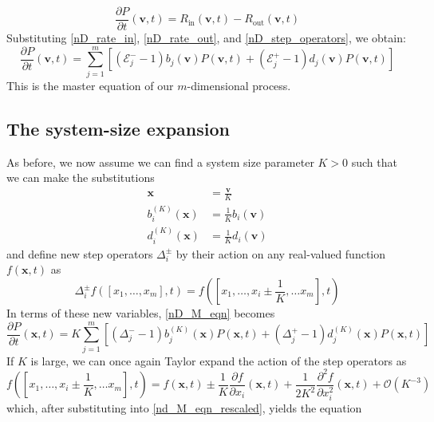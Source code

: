 \begin{equation}
\frac{\partial P}{\partial t}(\mathbf{v},t) = R_{\textrm{in}}(\mathbf{v},t) - R_{\textrm{out}}(\mathbf{v},t)
\end{equation}
Substituting \eqref{nD_rate_in}, \eqref{nD_rate_out}, and \eqref{nD_step_operators}, we obtain:
\begin{equation}
\label{nD_M_eqn}
\frac{\partial P}{\partial t}(\mathbf{v},t) = \sum\limits_{j=1}^{m}\left[(\mathcal{E}_j^{-}-1)b_j(\mathbf{v})P(\mathbf{v},t) + (\mathcal{E}_j^{+}-1)d_j(\mathbf{v})P(\mathbf{v},t)\right]
\end{equation}
This is the master equation of our $m$-dimensional process.

\subsection{The system-size expansion}
As before, we now assume we can find a system size parameter $K > 0$ such that we can make the substitutions
\begin{align*}
\mathbf{x} &= \frac{\mathbf{v}}{K}\\
b^{(K)}_i(\mathbf{x}) &= \frac{1}{K}b_i(\mathbf{v})\\
d^{(K)}_i(\mathbf{x}) &= \frac{1}{K}d_i(\mathbf{v})
\end{align*}
and define new step operators $\Delta_{i}^{\pm}$ by their action on any real-valued function $f(\mathbf{x},t)$ as
\begin{equation}
\label{nD_step_operators_rescaled}
\Delta_{i}^{\pm}f([x_1,\ldots,x_m],t) = f([x_1,\ldots,x_i \pm \frac{1}{K}, \ldots x_m],t)
\end{equation}
In terms of these new variables, \eqref{nD_M_eqn} becomes
\begin{equation}
\label{nd_M_eqn_rescaled}
\frac{\partial P}{\partial t}(\mathbf{x},t) = K\sum\limits_{j=1}^{m}\left[(\Delta_j^{-}-1)b^{(K)}_j(\mathbf{x})P(\mathbf{x},t) + (\Delta_j^{+}-1)d^{(K)}_j(\mathbf{x})P(\mathbf{x},t)\right]
\end{equation}
If $K$ is large, we can once again Taylor expand the action of the step operators as
\begin{equation*}
f([x_1,\ldots,x_i \pm \frac{1}{K}, \ldots x_m],t) = f(\mathbf{x},t) \pm \frac{1}{K}\frac{\partial f}{\partial x_i}(\mathbf{x},t) + \frac{1}{2K^2}\frac{\partial^2f}{\partial x_i^2}(\mathbf{x},t) + \mathcal{O}(K^{-3})
\end{equation*}
which, after substituting into \eqref{nd_M_eqn_rescaled}, yields the equation
